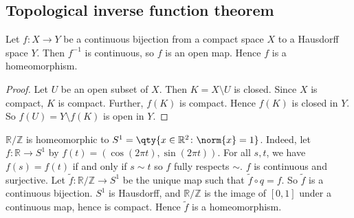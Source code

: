 \subsection{Topological inverse function theorem}
\begin{theorem}
	Let \( f \colon X \to Y \) be a continuous bijection from a compact space \( X \) to a Hausdorff space \( Y \).
	Then \( f^{-1} \) is continuous, so \( f \) is an open map.
	Hence \( f \) is a homeomorphism.
\end{theorem}
\begin{proof}
	Let \( U \) be an open subset of \( X \).
	Then \( K = X \setminus U \) is closed.
	Since \( X \) is compact, \( K \) is compact.
	Further, \( f(K) \) is compact.
	Hence \( f(K) \) is closed in \( Y \).
	So \( f(U) = Y \setminus f(K) \) is open in \( Y \).
\end{proof}
\begin{example}
	\( \mathbb R / \mathbb Z \) is homeomorphic to \( S^1 = \qty{ x \in \mathbb R^2 \colon \norm{x} = 1 } \).
	Indeed, let \( f \colon \mathbb R \to S^1 \) by \( f(t) = (\cos(2\pi t), \sin(2 \pi t)) \).
	For all \( s,t \), we have \( f(s) = f(t) \) if and only if \( s \sim t \) so \( f \) fully respects \( \sim \).
	\( f \) is continuous and surjective.
	Let \( \widetilde f \colon \mathbb R / \mathbb Z \to S^1 \) be the unique map such that \( \widetilde f \circ q = f \).
	So \( \widetilde f \) is a continuous bijection.
	\( S^1 \) is Hausdorff, and \( \mathbb R / \mathbb Z \) is the image of \( [0,1] \) under a continuous map, hence is compact.
	Hence \( \widetilde f \) is a homeomorphism.
\end{example}

